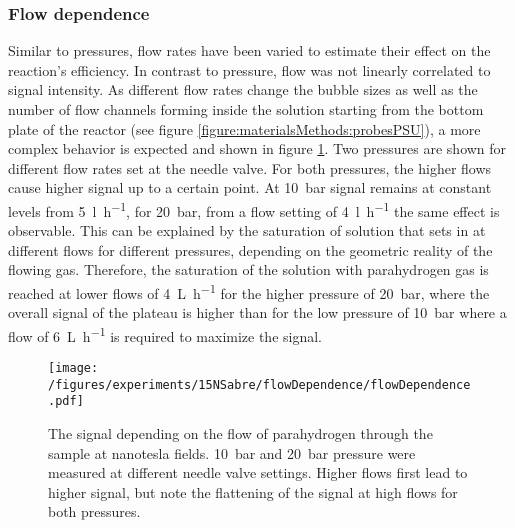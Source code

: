     \subsubsection{Flow dependence}
    Similar to pressures, flow rates have been varied to estimate their effect on the reaction's efficiency. In contrast to pressure, flow was not linearly correlated to signal intensity. As different flow rates change the bubble sizes as well as the number of flow channels forming inside the solution starting from the bottom plate of the reactor (see figure \ref{figure:materialsMethods:probesPSU}), a more complex behavior is expected and shown in figure \ref{fig:results:15N:flowDependence}. Two pressures are shown for different flow rates set at the needle valve. For both pressures, the higher flows cause higher signal up to a certain point. At \SI{10}{\bar} signal remains at constant levels from \SI{5}{\litre\per\hour}, for \SI{20}{\bar}, from a flow setting of \SI{4}{\litre\per\hour} the same effect is observable. This can be explained by the saturation of solution that sets in at different flows for different pressures, depending on the geometric reality of the flowing gas. Therefore, the saturation of the solution with parahydrogen gas is reached at lower flows  of \SI{4}{\liter\per\hour} for the higher pressure of \SI{20}{\bar}, where the overall signal of the plateau is higher than for the low pressure of \SI{10}{\bar} where a flow of \SI{6}{\liter\per\hour} is required to maximize the signal.
        \begin{figure}
            \texttt{[image: /figures/experiments/15NSabre/flowDependence/flowDependence.pdf]}
            \caption[Flow dependence]{The signal depending on the flow of parahydrogen through the sample at nanotesla fields. \SI{10}{\bar} and \SI{20}{\bar} pressure were measured at different needle valve settings. Higher flows first lead to higher signal, but note the flattening of the signal at high flows for both pressures.}
            \label{fig:results:15N:flowDependence}
        \end{figure}
